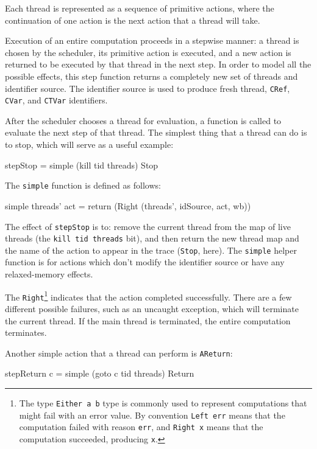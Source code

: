 Each thread is represented as a sequence of primitive actions, where
the continuation of one action is the next action that a thread will
take.

Execution of an entire computation proceeds in a stepwise manner: a
thread is chosen by the scheduler, its primitive action is executed,
and a new action is returned to be executed by that thread in the next
step. In order to model all the possible effects, this step function
returns a completely new set of threads and identifier source. The
identifier source is used to produce fresh thread, \verb|CRef|,
\verb|CVar|, and \verb|CTVar| identifiers.

After the scheduler chooses a thread for evaluation, a function is
called to evaluate the next step of that thread. The simplest thing
that a thread can do is to stop, which will serve as a useful example:

\begin{haskellcode}
stepStop = simple (kill tid threads) Stop
\end{haskellcode}

The \verb|simple| function is defined as follows:

\begin{haskellcode}
simple threads' act = return (Right (threads', idSource, act, wb))
\end{haskellcode}

The effect of \verb|stepStop| is to: remove the current thread from
the map of live threads (the \verb|kill tid threads| bit), and then
return the new thread map and the name of the action to appear in the
trace (\verb|Stop|, here). The \verb|simple| helper function is for
actions which don't modify the identifier source or have any
relaxed-memory effects.

The \verb|Right|\footnote{The type \texttt{Either a b} type is
  commonly used to represent computations that might fail with an
  error value. By convention \texttt{Left err} means that the
  computation failed with reason \texttt{err}, and \texttt{Right x}
  means that the computation succeeded, producing \texttt{x}.}
indicates that the action completed successfully. There are a few
different possible failures, such as an uncaught exception, which will
terminate the current thread. If the main thread is terminated, the
entire computation terminates.

Another simple action that a thread can perform is \verb|AReturn|:

\begin{haskellcode}
stepReturn c = simple (goto c tid threads) Return
\end{haskellcode}

